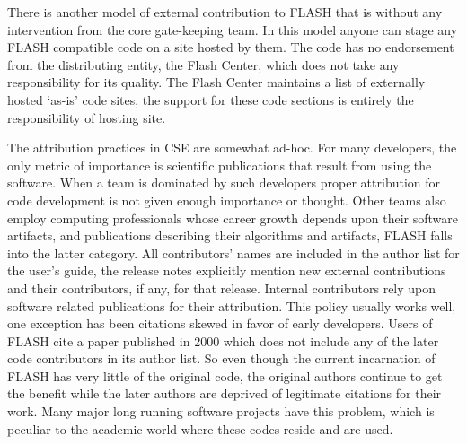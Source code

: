 There is another model of external contribution to FLASH that is
without any intervention from the core gate-keeping team. In this
model anyone can stage any FLASH compatible code on a site hosted by
them. The code has no endorsement from the distributing entity, the
Flash Center, which does not take any responsibility for its
quality. The Flash Center maintains a list of externally hosted
`as-is' code sites, the support for these code sections is entirely
the responsibility of hosting site. 

The attribution practices in CSE are somewhat ad-hoc. For many
developers, the only metric of importance is scientific
publications that result from using the software. When a team is
dominated by such developers proper attribution for code development
is not given enough importance or thought. Other teams also employ
computing professionals whose career growth depends upon their
software artifacts, and publications describing their algorithms and
artifacts, FLASH falls into the latter category. All 
contributors' names are included in the author list for the user's
guide, the release notes explicitly mention new external
contributions and their contributors, if any, for that
release. Internal contributors rely upon software related publications
for their attribution. This policy  usually works well, one
exception  has been citations skewed in favor of early
developers. Users of FLASH cite a paper published in 2000
\cite{Fryxell2000} which does not include any of the later code
contributors in its author list.  So even though the current
incarnation of FLASH has very little of the original code, the
original authors continue to get the benefit while the later authors
are deprived of legitimate citations for their work.  Many major long
running software projects have this problem, which is peculiar to the academic world where these
codes reside and are used.  

